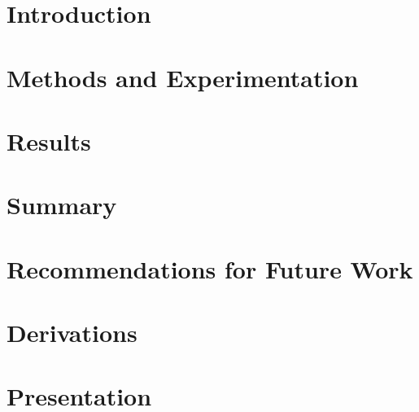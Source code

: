 \documentclass[12pt,american]{report}
\begin{document}
\renewcommand\thepage{}
%

\newpage
\mbox{}
\newpage

\renewcommand\thepage{\arabic{page}}
\setcounter{page}{2}

\doublespacing%



\singlespacing%
\tableofcontents             %
\listoffigures               %



\cleardoublepage%


\doublespacing%

\chapter{Introduction}

\chapter{Methods and Experimentation}



\chapter{Results}

\chapter{Summary}

\chapter{Recommendations for Future Work}


\appendix
\chapter{Derivations}

\chapter{Presentation}
\end{document}
